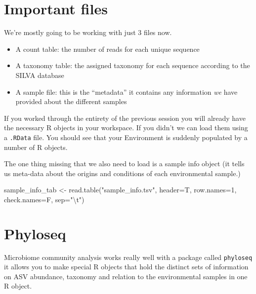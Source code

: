 \documentclass[
]{book}
\newenvironment{Shaded}{\begin{snugshade}}{\end{snugshade}}
\newcommand{\AttributeTok}[1]{\textcolor[rgb]{0.77,0.63,0.00}{#1}}
\newcommand{\DecValTok}[1]{\textcolor[rgb]{0.00,0.00,0.81}{#1}}
\newcommand{\FunctionTok}[1]{\textcolor[rgb]{0.00,0.00,0.00}{#1}}
\newcommand{\NormalTok}[1]{#1}
\newcommand{\OtherTok}[1]{\textcolor[rgb]{0.56,0.35,0.01}{#1}}
\newcommand{\SpecialCharTok}[1]{\textcolor[rgb]{0.00,0.00,0.00}{#1}}
\newcommand{\StringTok}[1]{\textcolor[rgb]{0.31,0.60,0.02}{#1}}
\begin{document}
\hypertarget{important-files}{%
\section{Important files}\label{important-files}}

We're mostly going to be working with just 3 files now.

\begin{itemize}
\item
  A count table: the number of reads for each unique sequence
\item
  A taxonomy table: the assigned taxonomy for each sequence according to the SILVA database
\item
  A sample file: this is the ``metadata'' it contains any information \emph{we} have provided about the different samples
\end{itemize}

If you worked through the entirety of the previous session you will already have the necessary R objects in your workspace. If you didn't we can load them using a \texttt{.RData} file. You should see that your Environment is suddenly populated by a number of R objects.

The one thing missing that we also need to load is a sample info object (it tells us meta-data about the origins and conditions of each environmental sample.)

\begin{Shaded}
\begin{Highlighting}[]
\NormalTok{sample\_info\_tab }\OtherTok{\textless{}{-}} \FunctionTok{read.table}\NormalTok{(}\StringTok{"sample\_info.tsv"}\NormalTok{, }\AttributeTok{header=}\NormalTok{T, }\AttributeTok{row.names=}\DecValTok{1}\NormalTok{,}
                   \AttributeTok{check.names=}\NormalTok{F, }\AttributeTok{sep=}\StringTok{"}\SpecialCharTok{\textbackslash{}t}\StringTok{"}\NormalTok{)}
\end{Highlighting}
\end{Shaded}

\hypertarget{phyloseq}{%
\section{Phyloseq}\label{phyloseq}}

Microbiome community analysis works really well with a package called \texttt{phyloseq} it allows you to make special R objects that hold the distinct sets of information on ASV abundance, taxonomy and relation to the environmental samples in one R object.
\end{document}
